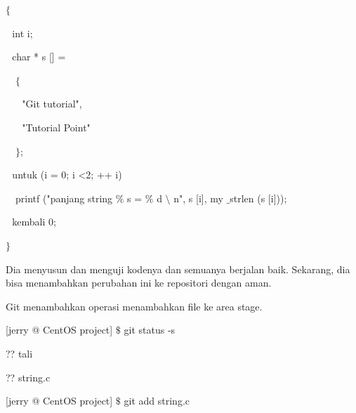 \noindent 
 \hspace*{0.5in}  $  \{  $ \par
\noindent 
 \hspace*{0.5in}  $  $ $  $ $  $int i; \par
\noindent 
 \hspace*{0.5in}  $  $ $  $ $  $char * s [] = \par
\noindent 
 \hspace*{0.5in}  $  $ $  $ $  $ $  \{  $ \par
\noindent 
 \hspace*{0.5in}  $  $ $  $ $  $ $  $ $  $ $  $"Git tutorial", \par
\noindent 
 \hspace*{0.5in}  $  $ $  $ $  $ $  $ $  $ $  $"Tutorial Point" \par
\noindent 
 \hspace*{0.5in}  $  $ $  $ $  $ $  \}  $; \par
\noindent 
 \hspace*{0.5in}  $  $ $  $ $  $untuk (i = 0; i <2; ++ i) $  $ $  $ $  $ $  $ $  $ $  $ \par
\noindent 
 $  $ $  $ $  $ \hspace*{0.5in} printf ("panjang string $  \%  $ s = $  \%  $ d  $  \setminus  $ n", s [i], my $  \_  $strlen (s [i])); \par
\noindent 
 \hspace*{0.5in}  $  $ $  $ $  $kembali 0; \par
\noindent 
 \hspace*{0.5in}  $  \}  $ \par
 \vspace{\baselineskip}
\noindent 
Dia menyusun dan menguji kodenya dan semuanya berjalan baik. Sekarang, dia bisa menambahkan perubahan ini ke repositori dengan aman. \par
\vspace{\baselineskip}
\noindent 
Git menambahkan operasi menambahkan file ke area stage. \par
\noindent 
 \hspace*{0.5in} [jerry @ CentOS project]  $  \$  $ git status -s \par
\noindent 
 \hspace*{0.5in} ?? tali \par
\noindent 
 \hspace*{0.5in} ?? string.c \par
\noindent 
 \hspace*{0.5in} [jerry @ CentOS project]  $  \$  $ git add string.c \par
